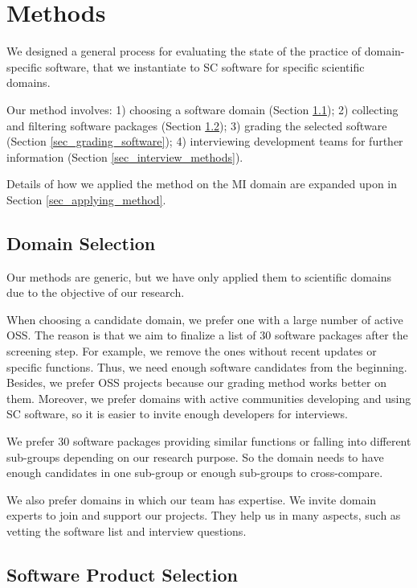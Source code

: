 \chapter{Methods}
\label{ch_methods}

We designed a general process for evaluating the state of the practice of domain-specific software, that we instantiate to SC software for specific scientific domains.

Our method involves: 1) choosing a software domain (Section \ref{sec_domain_selection}); 2) collecting and filtering software packages (Section \ref{sec_software_selection}); 3) grading the selected software (Section \ref{sec_grading_software}); 4) interviewing development teams for further information (Section \ref{sec_interview_methods}).

Details of how we applied the method on the MI domain are expanded upon in Section \ref{sec_applying_method}.

\section{Domain Selection}
\label{sec_domain_selection}
Our methods are generic, but we have only applied them to scientific domains due to the objective of our research.

When choosing a candidate domain, we prefer one with a large number of active OSS. The reason is that we aim to finalize a list of 30 software packages \cite{SmithEtAl2021} after the screening step. For example, we remove the ones without recent updates or specific functions. Thus, we need enough software candidates from the beginning. Besides, we prefer OSS projects because our grading method works better on them. Moreover, we prefer domains with active communities developing and using SC software, so it is easier to invite enough developers for interviews.

We prefer 30 software packages providing similar functions or falling into different sub-groups depending on our research purpose. So the domain needs to have enough candidates in one sub-group or enough sub-groups to cross-compare.

We also prefer domains in which our team has expertise. We invite domain experts to join and support our projects. They help us in many aspects, such as vetting the software list and interview questions.

\section{Software Product Selection}
\label{sec_software_selection}

